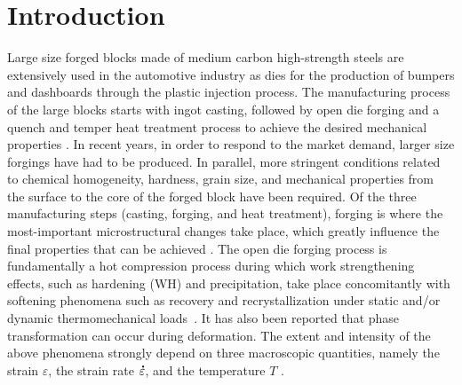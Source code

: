 \documentclass[metals,article,accept,pdftex,moreauthors]{Definitions/mdpi}
\DeclareRobustCommand{\mdot}[1]{\accentset{\mbox{\bfseries .}}{#1}}
\begin{document}
\section{Introduction\label{sec:Introduction}}
Large size forged blocks made of medium carbon high-strength steels are extensively used in the automotive industry as dies for the production of bumpers and dashboards through the plastic injection process.
The manufacturing process of the large blocks starts with ingot casting, followed by open die forging and a quench and temper heat treatment process to achieve the desired mechanical properties \cite{chadha2017deformation, chadha2018influence, murugesan2019two}.
In recent years, in order to respond to the market demand, larger size forgings have had to be produced.
In parallel, more stringent conditions related to chemical homogeneity, hardness, grain size, and mechanical properties from the surface to the core of the forged block have been required.
Of the three manufacturing steps (casting, forging, and heat treatment), forging is where the most-important microstructural changes take place, which greatly influence the final properties that can be achieved \cite{murugesan2019hybrid, chadha2020microstructure, sripada2022effect}.
The open die forging process is fundamentally a hot compression process during which work strengthening effects, such as hardening (WH) and precipitation, take place concomitantly with softening phenomena such as recovery and recrystallization under static and/or dynamic thermomechanical loads~\cite{tian2022deformation, tavakoli2019ferrite}.
It has also been reported that phase transformation can occur during deformation.
The extent and intensity of the above phenomena strongly depend on three macroscopic quantities, namely the strain $\varepsilon$, the strain rate $\mdot\varepsilon$, and the temperature $T$ \cite{ebrahimi2017flow, shi2022constitutive, zeng2022constitutive, rudra2019constitutive}.
\end{document}

